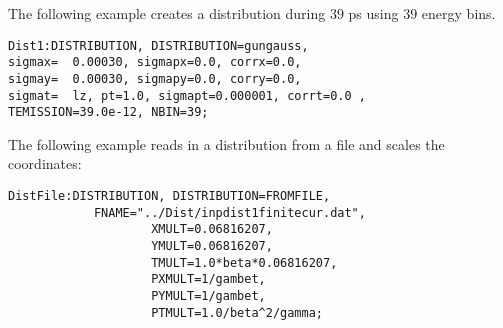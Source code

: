 The following example creates a distribution during $39$ ps using $39$ energy bins.
\begin{verbatim}
Dist1:DISTRIBUTION, DISTRIBUTION=gungauss,
sigmax=  0.00030, sigmapx=0.0, corrx=0.0,
sigmay=  0.00030, sigmapy=0.0, corry=0.0,
sigmat=  lz, pt=1.0, sigmapt=0.000001, corrt=0.0 , 
TEMISSION=39.0e-12, NBIN=39;
\end{verbatim}

The following example reads in a distribution from a file and scales the coordinates:
\begin{verbatim}
DistFile:DISTRIBUTION, DISTRIBUTION=FROMFILE,
			FNAME="../Dist/inpdist1finitecur.dat",
                   	XMULT=0.06816207,
                   	YMULT=0.06816207,
                   	TMULT=1.0*beta*0.06816207,
                   	PXMULT=1/gambet,
                   	PYMULT=1/gambet,
                   	PTMULT=1.0/beta^2/gamma;
\end{verbatim}
